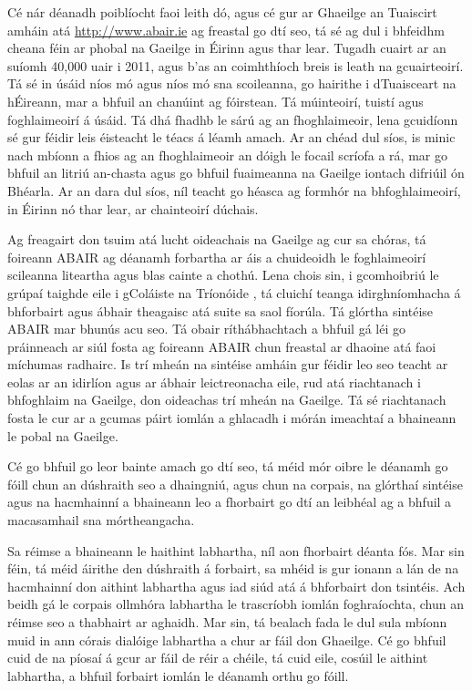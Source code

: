 \begin{multicols}{2}
Cé nár déanadh poiblíocht faoi leith dó, agus cé gur ar Ghaeilge an Tuaiscirt amháin atá \url{http://www.abair.ie} ag freastal go dtí seo, tá sé ag dul i bhfeidhm cheana féin ar phobal na Gaeilge in Éirinn agus thar lear. Tugadh cuairt ar an suíomh 40,000 uair i 2011, agus b’as an coimhthíoch breis is leath na gcuairteoirí. Tá sé in úsáid níos mó agus níos mó sna scoileanna, go hairithe i dTuaisceart na hÉireann, mar a bhfuil an chanúint ag fóirstean. Tá múinteoirí, tuistí agus foghlaimeoirí á úsáid. Tá dhá fhadhb le sárú ag an fhoghlaimeoir, lena gcuidíonn sé gur féidir leis éisteacht le téacs á léamh amach. Ar an chéad dul síos, is minic nach mbíonn a fhios ag an fhoghlaimeoir an dóigh le focail scríofa a rá, mar go bhfuil an litriú an-chasta agus go bhfuil fuaimeanna na Gaeilge iontach difriúil ón Bhéarla. Ar an dara dul síos, níl teacht go héasca ag formhór na bhfoghlaimeoirí, in Éirinn nó thar lear, ar chainteoirí dúchais.

Ag freagairt don tsuim atá lucht oideachais na Gaeilge ag cur sa chóras, tá foireann ABAIR ag déanamh forbartha ar áis a chuideoidh le foghlaimeoirí scileanna liteartha agus blas cainte a chothú. Lena chois sin, i gcomhoibriú le grúpaí taighde eile i gColáiste na Tríonóide \cite{slate2011}, tá cluichí teanga idirghníomhacha á bhforbairt agus ábhair theagaisc atá suite sa saol fíorúla. Tá glórtha sintéise ABAIR mar bhunús acu seo. Tá obair ríthábhachtach a bhfuil gá léi go práinneach ar siúl fosta ag foireann ABAIR chun freastal ar dhaoine atá faoi míchumas radhairc. Is trí mheán na sintéise amháin gur féidir leo seo teacht ar eolas ar an idirlíon agus ar ábhair leictreonacha eile, rud atá riachtanach i bhfoghlaim na Gaeilge, don oideachas trí mheán na Gaeilge. Tá sé riachtanach fosta le cur ar a gcumas páirt iomlán a ghlacadh i mórán imeachtaí a bhaineann le pobal na Gaeilge.

Cé go bhfuil go leor bainte amach go dtí seo, tá méid mór oibre le déanamh go fóill chun an dúshraith seo a dhaingniú, agus chun na corpais, na glórthaí sintéise agus na hacmhainní a bhaineann leo a fhorbairt go dtí an leibhéal ag a bhfuil a macasamhail sna mórtheangacha.     

Sa réimse a bhaineann le haithint labhartha, níl aon fhorbairt déanta fós. Mar sin féin, tá méid áirithe den dúshraith á forbairt, sa mhéid is gur ionann a lán de na hacmhainní don aithint labhartha agus iad siúd atá á bhforbairt don tsintéis. Ach beidh gá le corpais ollmhóra labhartha le trascríobh iomlán foghraíochta, chun an réimse seo a thabhairt ar aghaidh. Mar sin, tá bealach fada le dul sula mbíonn muid in ann córais dialóige labhartha a chur ar fáil don Ghaeilge. Cé go bhfuil cuid de na píosaí á gcur ar fáil de réir a chéile, tá cuid eile, cosúil le aithint labhartha, a bhfuil forbairt iomlán le déanamh orthu go fóill.


\end{multicols}
